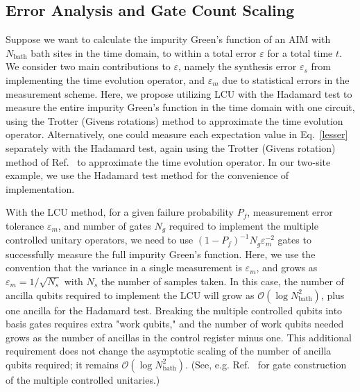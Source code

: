 \documentclass[aip,reprint,table,xcdraw,usenames,dvipsnames]{revtex4-1}
\begin{document}
\subsection*{Error Analysis and Gate Count Scaling} \label{sec:gatecount}
Suppose we want to calculate the impurity Green's 
function of an AIM with $N_{\text{bath}}$ bath sites in the time domain, to 
within a total error
$\varepsilon$ for a total time $t$. We consider two main 
contributions to 
$\varepsilon$, namely the synthesis error $\varepsilon_s$
from implementing the time evolution operator, and 
$\varepsilon_m$ due to statistical errors in the 
measurement scheme. Here, we propose utilizing 
LCU with the Hadamard test to measure the entire 
impurity Green's function 
in the time domain with one circuit, using the Trotter (Givens rotations) 
method to approximate the time evolution operator. 
Alternatively, one could 
measure each expectation value in Eq.~\eqref{lesser}
separately with the Hadamard test, again using
the Trotter (Givens rotation) method of Ref.~
 to approximate the time 
evolution operator. In our two-site example, we use
the Hadamard test method for the convenience of implementation.



With the LCU method, for a given failure probability $P_f$, measurement error tolerance $\varepsilon_m$, and number of gates $N_g$ required to implement the multiple controlled unitary operators, we need to use $(1-P_f)^{-1} 
N_g \varepsilon_m^{-2}$ gates to successfully measure the full impurity 
Green's function. Here, we use the convention that the variance in a 
single measurement is $\varepsilon_m$, and grows as $\varepsilon_m = 1/\sqrt{N_s}$ with $N_s$ the number of samples taken. In this case, the number
of ancilla qubits required to implement the LCU will grow as $\mathcal{O}
(\log N_{\text{bath}}^2 )$, plus one ancilla for the Hadamard test. Breaking the multiple controlled
qubits into basis gates requires extra "work qubits," and the number of work qubits needed grows as the number of ancillas in the control register minus one. This additional requirement does not change the asymptotic scaling of the number of ancilla qubits required; it remains
$\mathcal{O}(\log N_{\text{bath}}^2 )$.
(See, e.g. Ref.~ for gate construction of the multiple controlled unitaries.) 
\end{document}
